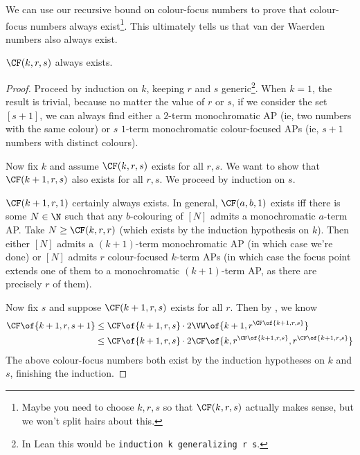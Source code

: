 We can use our recursive bound on colour-focus numbers to prove that colour-focus numbers always exist\footnote{Maybe you need to choose $k, r, s$ so that $\CF(k, r, s)$ actually makes sense, but we won't split hairs about this.}. This ultimately tells us that van der Waerden numbers also always exist.

\begin{boxtheorem}
    $\CF(k, r, s)$ always exists.
\end{boxtheorem}
\begin{proof}
    Proceed by induction on $k$, keeping $r$ and $s$ generic\footnote{In Lean this would be \lstinline|induction k generalizing r s|.}. When $k = 1$, the result is trivial, because no matter the value of $r$ or $s$, if we consider the set $[s + 1]$, we can always find either a $2$-term monochromatic AP (ie, two numbers with the same colour) or $s$ $1$-term monochromatic colour-focused APs (ie, $s + 1$ numbers with distinct colours).

    Now fix $k$ and assume $\CF(k, r, s)$ exists for all $r, s$. We want to show that $\CF(k + 1, r, s)$ also exists for all $r, s$. We proceed by induction on $s$.

    $\CF(k + 1, r, 1)$ certainly always exists. In general, $\CF(a, b, 1)$ exists iff there is some $N \in \N$ such that any $b$-colouring of $[N]$ admits a monochromatic $a$-term AP. Take $N \geq \CF(k, r, r)$ (which exists by the induction hypothesis on $k$). Then either $[N]$ admits a $(k + 1)$-term monochromatic AP (in which case we're done) or $[N]$ admits $r$ colour-focused $k$-term APs (in which case the focus point extends one of them to a monochromatic $(k + 1)$-term AP, as there are precisely $r$ of them).

    Now fix $s$ and suppose $\CF(k + 1, r, s)$ exists for all $r$. Then by , we know
    \begin{align*}
        \CF\of{k + 1, r, s + 1}
        &\leq \CF\of{k + 1, r, s} \cdot 2 \VW\of{k + 1, r^{\CF\of{k + 1, r, s}}} \\
        &\leq \CF\of{k + 1, r, s} \cdot 2 \CF\of{k, r^{\CF\of{k + 1, r, s}}, r^{\CF\of{k + 1, r, s}}}
    \end{align*}
    The above colour-focus numbers both exist by the induction hypotheses on $k$ and $s$, finishing the induction.
\end{proof}

